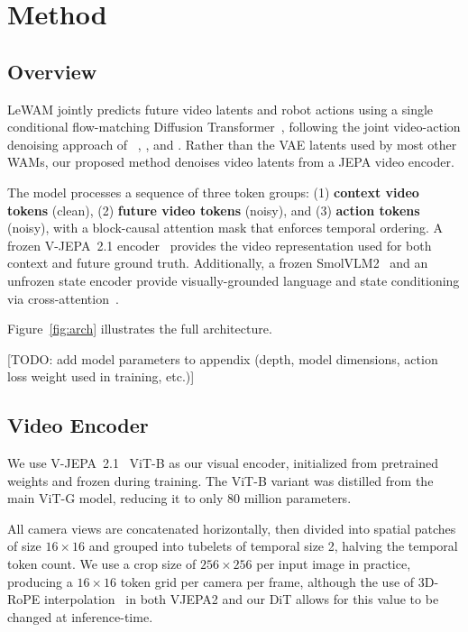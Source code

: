 \section{Method}

\subsection{Overview}

LeWAM jointly predicts future video latents and robot actions using a single conditional flow-matching Diffusion Transformer~\cite{DiT, FlowMatching, esser2024scaling}, following the joint video-action denoising approach of ~\citet{DreamZero}, \citet{UWM}, and \citet{CosmosPolicy}. Rather than the VAE latents used by most other WAMs, our proposed method denoises video latents from a JEPA video encoder.

The model processes a sequence of three token groups: (1) \textbf{context video tokens} (clean), (2) \textbf{future video tokens} (noisy), and (3) \textbf{action tokens} (noisy), with a block-causal attention mask that enforces temporal ordering.
A frozen V-JEPA~2.1 encoder~\cite{vjepa2_1} provides the video representation used for both context and future ground truth. Additionally, a frozen SmolVLM2~\cite{SmolVLM2, SmolVLA} and an unfrozen state encoder provide visually-grounded language and state conditioning via cross-attention~\cite{GenTron}.

Figure~\ref{fig:arch} illustrates the full architecture.

[TODO: add model parameters to appendix (depth, model dimensions, action loss weight used in training, etc.)]


\subsection{Video Encoder}

We use V-JEPA~2.1~\citep{vjepa2_1} ViT-B as our visual encoder, initialized from pretrained weights and frozen during training. The ViT-B variant was distilled from the main ViT-G model, reducing it to only 80 million parameters. 

All camera views are concatenated horizontally, then divided into spatial patches of size $16 \times 16$ and grouped into tubelets of temporal size 2, halving the temporal token count.
We use a crop size of $256 \times 256$ per input image in practice, producing a $16 \times 16$ token grid per camera per frame, although the use of 3D-RoPE interpolation~\cite{ThreeDRoPE} in both VJEPA2 and our DiT allows for this value to be changed at inference-time.

